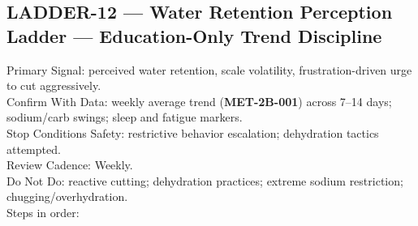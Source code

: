 \documentclass[10pt]{article}
\begin{document}
\newpage

\subsection*{LADDER-12 — Water Retention Perception Ladder — Education-Only Trend Discipline}
{}

Primary Signal: perceived water retention, scale volatility, frustration-driven urge to cut aggressively.\\
Confirm With Data: weekly average trend (\textbf{MET-2B-001}) across 7–14 days; sodium/carb swings; sleep and fatigue markers.\\
Stop Conditions Safety: restrictive behavior escalation; dehydration tactics attempted.\\
Review Cadence: Weekly.\\
Do Not Do: reactive cutting; dehydration practices; extreme sodium restriction; chugging/overhydration.\\
Steps in order:
\end{document}
